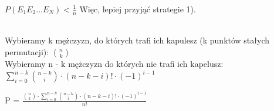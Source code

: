 \documentclass[fleqn]{article}
\begin{document}
$ P(E_{1}E_{2}...E_{N}) < \frac{1}{n}$
Więc, lepiej przyjąć strategie 1).
\medskip

\medskip


 \\
Wybieramy k mężczyzn, do których trafi ich kapulesz (k punktów stałych permutacji): ${n}\choose{k}$\\
Wybieramy n - k mężczyzn do których nie trafi ich kapelusz:\\ $\sum_{i=0}^{n-k} {{n-k}\choose{i}}  \cdot (n-k-i)! \cdot (-1)^{i-1} $

P =  $  \frac{{{n}\choose{k}} \cdot{\sum_{i=0}^{n-k} {{n-k}\choose{i}}  \cdot (n-k-i)! \cdot (-1)^{i-1}}  }{n!} $




\medskip
\end{document}
